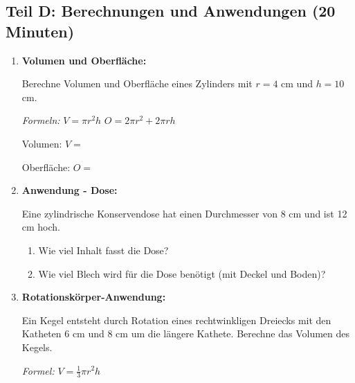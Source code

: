 \subsection*{Teil D: Berechnungen und Anwendungen (20 Minuten)}

\begin{enumerate}[label=\arabic*.,resume]

    \item \textbf{Volumen und Oberfläche:}

    Berechne Volumen und Oberfläche eines Zylinders mit $r = 4$ cm und $h = 10$ cm.

    \textit{Formeln:} $V = \pi r^2 h$ \hspace{2cm} $O = 2\pi r^2 + 2\pi r h$

    \vspace{0.5cm}

    Volumen: $V = $ \underline{\hspace{8cm}}

    \vspace{1.5cm}

    Oberfläche: $O = $ \underline{\hspace{8cm}}

    \vspace{1.5cm}

    \item \textbf{Anwendung - Dose:}

    Eine zylindrische Konservendose hat einen Durchmesser von 8 cm und ist 12 cm hoch.

    \begin{enumerate}[label=\alph*)]
        \item Wie viel Inhalt fasst die Dose?

        \vspace{2cm}

        \item Wie viel Blech wird für die Dose benötigt (mit Deckel und Boden)?

        \vspace{2cm}

    \end{enumerate}

    \item \textbf{Rotationskörper-Anwendung:}

    Ein Kegel entsteht durch Rotation eines rechtwinkligen Dreiecks mit den Katheten 6 cm und 8 cm um die längere Kathete. Berechne das Volumen des Kegels.

    \textit{Formel:} $V = \frac{1}{3}\pi r^2 h$

    \vspace{3cm}

\end{enumerate}